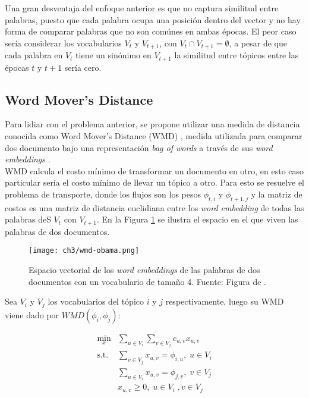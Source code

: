 \documentclass[letterpaper,12pt,oneside]{book} %
\begin{document}
Una gran desventaja del enfoque anterior es que no captura similitud entre palabras, puesto que cada palabra ocupa una posición dentro del vector y no hay forma de comparar palabras que no son comúnes en ambas épocas. El peor caso sería considerar los vocabularios $V_{t}$ y $V_{t+1}$, con $V_{t}\cap V_{t+1} =  \emptyset$, a pesar de que cada palabra en $V_{t}$ tiene un sinónimo en $V_{t+1}$ la similitud entre tópicos entre las épocas $t$ y $t+1$ sería cero.\\

\subsection{Word Mover's Distance}

Para lidiar con el problema anterior, se propone utilizar una medida de distancia conocida como Word Mover's Distance (WMD) \citep{kusner2015word}, medida utilizada para comparar dos documento bajo una representación \textit{bag of words} a través de sus \textit{word embeddings} \citep{mikolov2013distributed}.\\

WMD calcula el costo mínimo de transformar un documento en otro, en esto caso particular sería el costo mínimo de llevar un tópico a otro. Para esto se resuelve el problema de transporte, donde los flujos son los pesos $\phi_{t,i}$ y $\phi_{t+1,j}$ y la matriz de costos es una matriz de distancia euclidiana entre los \textit{word embedding} de todas las palabras deS $V_{t}$ con $V_{t+1}$. En la Figura \ref{img:wmd_obama} se ilustra el espacio en el que viven las palabras de dos documentos.

\begin{figure}
    \centering
    \texttt{[image: ch3/wmd-obama.png]}
    \caption{Espacio vectorial de los \textit{word embeddings} de las palabras de dos documentos con un vocabulario de tamaño 4. Fuente: Figura de \citep{WMDPy}.}
    \label{img:wmd_obama}
\end{figure}

Sea  $V_{i}$ y $V_{j}$ los vocabularios del tópico $i$ y $j$ respectivamente, luego su WMD viene dado por $WMD(\phi_{i}, \phi_{j})$:

\begin{align}
\underset{x}{\text{min}}&\sum_{u \in V_{i}}\sum_{v \in V_{j}} c_{u,v}x_{u,v} \\ 
\textrm{s.t.} &\sum_{v \in V_{j}}x_{u,v}= \phi_{i,u}, \; u \in V_{i}\\ 
& \sum_{u \in V_{i}}x_{u,v}= \phi_{j,v}, \; v\in V_{j}\\
& x_{u,v} \geq 0,\; u \in V_{i} \;, v \in V_{j}\\ \nonumber
\end{align}
\end{document}
